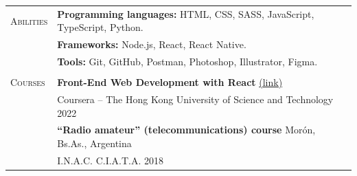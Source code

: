 \documentclass[11pt]{article}
\begin{document}
\begin{tabular}[t]{@{}p{30mm} @{}p{150mm}}
   {\scshape Abilities}
                      &
   \textbf{Programming languages: }  HTML, CSS, SASS, JavaScript, TypeScript, Python.%
   \vspace{0.7\baselineskip}
   \\
                      &
   \textbf{Frameworks: }  Node.js, React, React Native.%
   \vspace{0.7\baselineskip}
   \\
                      &
   \textbf{Tools: }  Git, GitHub, Postman, Photoshop, Illustrator, Figma.%
   \\
                      &
   \vspace{.3\baselineskip}
   {\noindent\hspace{-50mm}\hrulefill}
   \vspace{.7\baselineskip}
   \\
   {\scshape Courses} & \textbf{Front-End Web Development with React} \href{https://coursera.org/share/3222a48520eb4c70d96723ded8063968}{\small(link)}  \hfill \vspace{0.015in} \\
                      & Coursera -- The Hong Kong University of Science and Technology \hfill 2022\vspace{0.015in}
   \vspace{0.7\baselineskip}                                                                                                                                                    \\
                      & \textbf{“Radio amateur” (telecommunications) course}  \hfill Morón, Bs.As., Argentina\vspace{0.015in}                                                   \\
                      & I.N.A.C. C.I.A.T.A. \hfill 2018\vspace{0.015in}

\end{tabular}
\end{document}

